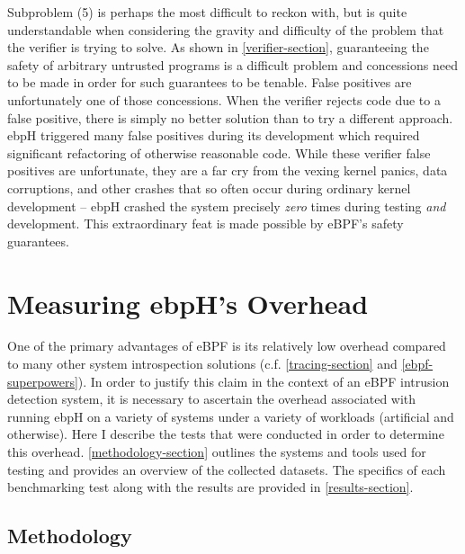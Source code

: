 \documentclass[
  12pt]{findlay}
\begin{document}
Subproblem (5) is perhaps the most difficult to reckon with, but is
quite understandable when considering the gravity and difficulty of the
problem that the verifier is trying to solve. As shown in
\autoref{verifier-section}, guaranteeing the safety of arbitrary
untrusted programs is a difficult problem and concessions need to be
made in order for such guarantees to be tenable. False positives are
unfortunately one of those concessions. When the verifier rejects code
due to a false positive, there is simply no better solution than to try
a different approach. ebpH triggered many false positives during its
development which required significant refactoring of otherwise
reasonable code. While these verifier false positives are unfortunate,
they are a far cry from the vexing kernel panics, data corruptions, and
other crashes that so often occur during ordinary kernel development --
ebpH crashed the system precisely \emph{zero} times during testing
\emph{and} development. This extraordinary feat is made possible by
eBPF's safety guarantees.

\hypertarget{measuring-ebphs-overhead}{%
\section{Measuring ebpH's Overhead}\label{measuring-ebphs-overhead}}

One of the primary advantages of eBPF is its relatively low overhead
\autocite{gregg19bpf,starovoitov13,starovoitov14} compared to many other
system introspection solutions (c.f. \autoref{tracing-section} and
\autoref{ebpf-superpowers}). In order to justify this claim in the
context of an eBPF intrusion detection system, it is necessary to
ascertain the overhead associated with running ebpH on a variety of
systems under a variety of workloads (artificial and otherwise). Here I
describe the tests that were conducted in order to determine this
overhead. \autoref{methodology-section} outlines the systems and tools
used for testing and provides an overview of the collected datasets. The
specifics of each benchmarking test along with the results are provided
in \autoref{results-section}.

\hypertarget{methodology}{%
\subsection{Methodology}\label{methodology}}

\label{methodology-section}
\end{document}
